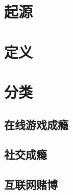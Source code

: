 

\section{起源}



\section{定义}




\section{分类}
\subsection{在线游戏成瘾}
\subsection{社交成瘾}
\subsection{互联网赌博}
